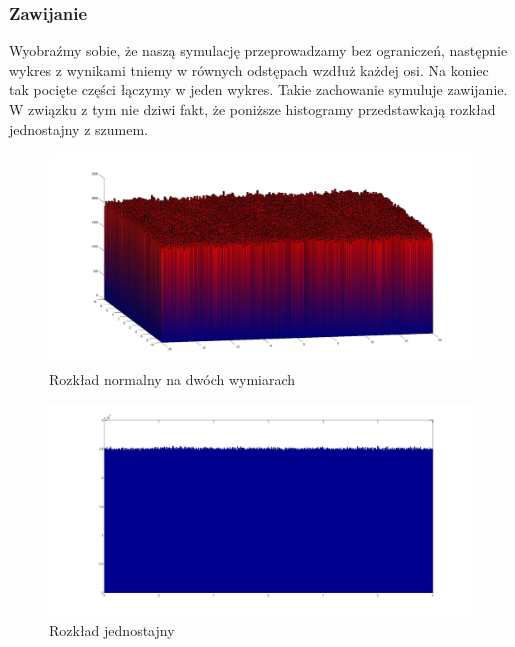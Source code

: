 \documentclass{mini}
\begin{document}
\subsubsection*{Zawijanie}
Wyobraźmy sobie, że naszą symulację przeprowadzamy bez ograniczeń, następnie wykres z wynikami tniemy w równych odstępach wzdłuż każdej osi. Na koniec tak pocięte części łączymy w jeden wykres. Takie zachowanie symuluje zawijanie. W związku z tym nie dziwi fakt, że poniższe histogramy przedstawkają rozkład jednostajny z szumem.
\begin{figure}[H]
\centering
\includegraphics[width=\textwidth]{w_n_10M_2__20_20__10_10_4_2}
\caption{Rozkład normalny na dwóch wymiarach}
\end{figure}

\begin{figure}[H]
\centering
\includegraphics[width=\textwidth]{w_j_20M_1__3_3}
\caption{Rozkład jednostajny}
\end{figure}
\end{document}

